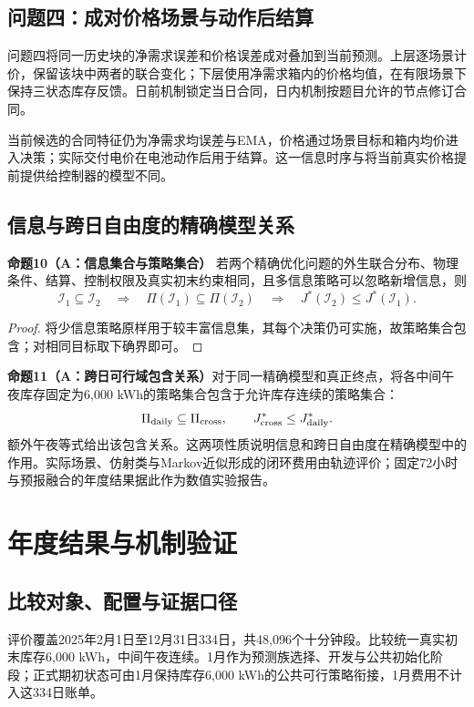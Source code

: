\documentclass[UTF8,a4paper,zihao=-4,fontset=mac]{ctexart}
\begin{document}
\subsection{问题四：成对价格场景与动作后结算}
问题四将同一历史块的净需求误差和价格误差成对叠加到当前预测。上层逐场景计价，保留该块中两者的联合变化；下层使用净需求箱内的价格均值，在有限场景下保持三状态库存反馈。日前机制锁定当日合同，日内机制按题目允许的节点修订合同。

当前候选的合同特征仍为净需求均误差与EMA，价格通过场景目标和箱内均价进入决策；实际交付电价在电池动作后用于结算。这一信息时序与将当前真实价格提前提供给控制器的模型不同。

\subsection{信息与跨日自由度的精确模型关系}
\noindent\textbf{命题10（A：信息集合与策略集合）}\quad
若两个精确优化问题的外生联合分布、物理条件、结算、控制权限及真实初末约束相同，且多信息策略可以忽略新增信息，则
\begin{equation}\label{eq:voi}
 \mathcal I_1\subseteq\mathcal I_2
 \quad\Longrightarrow\quad
 \Pi(\mathcal I_1)\subseteq\Pi(\mathcal I_2)
 \quad\Longrightarrow\quad J^*(\mathcal I_2)\le J^*(\mathcal I_1).
\end{equation}
\begin{proof}
将少信息策略原样用于较丰富信息集，其每个决策仍可实施，故策略集合包含；对相同目标取下确界即可。
\end{proof}
\noindent\textbf{命题11（A：跨日可行域包含关系）}\quad 对于同一精确模型和真正终点，将各中间午夜库存固定为6,000 kWh的策略集合包含于允许库存连续的策略集合：
\begin{equation}\label{eq:cross}
 \Pi_{\rm daily}\subseteq\Pi_{\rm cross},\qquad J^*_{\rm cross}\le J^*_{\rm daily}.
\end{equation}
额外午夜等式给出该包含关系。这两项性质说明信息和跨日自由度在精确模型中的作用。实际场景、仿射类与Markov近似形成的闭环费用由轨迹评价；固定72小时与预报融合的年度结果据此作为数值实验报告。

\section{年度结果与机制验证}
\subsection{比较对象、配置与证据口径}
评价覆盖2025年2月1日至12月31日334日，共48,096个十分钟段。比较统一真实初末库存6,000 kWh，中间午夜连续。1月作为预测族选择、开发与公共初始化阶段；正式期初状态可由1月保持库存6,000 kWh的公共可行策略衔接，1月费用不计入这334日账单。
\end{document}
